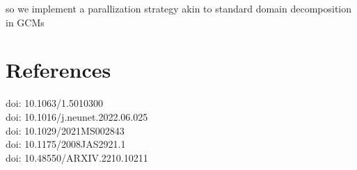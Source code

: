 \vspace{1em}
\hfill\begin{minipage}{0.97\textwidth}
    so we implement a parallization strategy akin to standard domain
    decomposition in GCMs
\end{minipage}

\section{References}
\vspace{1em}
\begin{minipage}{\textwidth}
         doi: 10.1063/1.5010300 \\
         doi: 10.1016/j.neunet.2022.06.025 \\
         doi: 10.1029/2021MS002843 \\
         doi: 10.1175/2008JAS2921.1 \\
         doi: 10.48550/ARXIV.2210.10211
\end{minipage}
